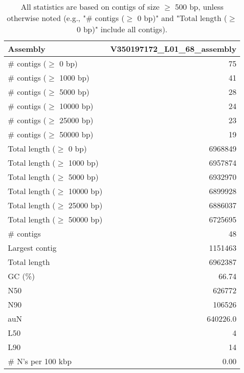 \documentclass[12pt,a4paper]{article}
\begin{document}
\begin{table}[ht]
\begin{center}
\caption{All statistics are based on contigs of size $\geq$ 500 bp, unless otherwise noted (e.g., "\# contigs ($\geq$ 0 bp)" and "Total length ($\geq$ 0 bp)" include all contigs).}
\begin{tabular}{|l*{1}{|r}|}
\hline
Assembly & V350197172\_L01\_68\_assembly \\ \hline
\# contigs ($\geq$ 0 bp) & 75 \\ \hline
\# contigs ($\geq$ 1000 bp) & 41 \\ \hline
\# contigs ($\geq$ 5000 bp) & 28 \\ \hline
\# contigs ($\geq$ 10000 bp) & 24 \\ \hline
\# contigs ($\geq$ 25000 bp) & 23 \\ \hline
\# contigs ($\geq$ 50000 bp) & 19 \\ \hline
Total length ($\geq$ 0 bp) & 6968849 \\ \hline
Total length ($\geq$ 1000 bp) & 6957874 \\ \hline
Total length ($\geq$ 5000 bp) & 6932970 \\ \hline
Total length ($\geq$ 10000 bp) & 6899928 \\ \hline
Total length ($\geq$ 25000 bp) & 6886037 \\ \hline
Total length ($\geq$ 50000 bp) & 6725695 \\ \hline
\# contigs & 48 \\ \hline
Largest contig & 1151463 \\ \hline
Total length & 6962387 \\ \hline
GC (\%) & 66.74 \\ \hline
N50 & 626772 \\ \hline
N90 & 106526 \\ \hline
auN & 640226.0 \\ \hline
L50 & 4 \\ \hline
L90 & 14 \\ \hline
\# N's per 100 kbp & 0.00 \\ \hline
\end{tabular}
\end{center}
\end{table}
\end{document}
